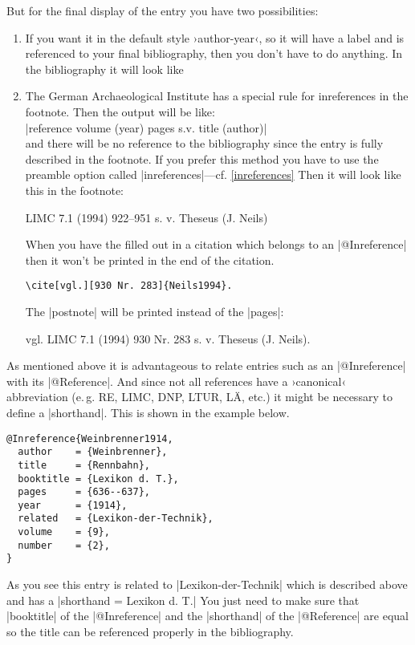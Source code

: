 \documentclass[a4paper,
10pt,
greek,
french,
spanish,
italian,
ngerman,
english
]{ltxdoc}
\begin{document}
But for the final display of the entry  you have two possibilities:
 \begin{enumerate}
\item\label{inreference:a} 

If you want it in the default style ›author-year‹, so it will have a label and is referenced 
to your final bibliography, then you don’t have to do anything.
In the bibliography it will look like

\item\label{inreference:b} 
The German Archaeological Institute has a special rule for inreferences in the footnote.
Then the output will be like:\\
|reference volume (year) pages s.v. title (author)| \\
and there will be no reference to the bibliography since the entry is fully described in the footnote.
 If you prefer this method you have to use the preamble option called  |inreferences|---cf. \cref{inreferences}
Then it will look like this in the footnote:
\begin{bsp}
LIMC 7.1 (1994) 922--951 s. v. Theseus (J. Neils)
\end{bsp}
When you have the  filled out in a citation which belongs to an |@Inreference| then it won’t be printed in the end of the citation.
\begin{lstlisting}
\cite[vgl.][930 Nr. 283]{Neils1994}.
\end{lstlisting}
The |postnote|  will be printed instead of the |pages|:
 \begin{bsp}
vgl. LIMC 7.1 (1994) 930 Nr. 283 s. v. Theseus (J. Neils).
 \end{bsp}
 
\end{enumerate}

As mentioned above it is  advantageous to relate entries such as  an |@Inreference| with its |@Reference|. 
And since not all references have a ›canonical‹ abbreviation (e.\,g. RE, LIMC, DNP, LTUR, LÄ, etc.) it might be necessary to define a |shorthand|.
This is shown in the example below.
 
\begin{lstlisting}[style=bibentry,label=Weinbrenner1914,caption={{@}Inreference\{Weinbrenner1914,…\} }]
@Inreference{Weinbrenner1914,
  author    = {Weinbrenner},
  title     = {Rennbahn},
  booktitle = {Lexikon d. T.},
  pages     = {636--637},
  year      = {1914},
  related   = {Lexikon-der-Technik},
  volume    = {9},
  number    = {2},
}
\end{lstlisting}
As you see this entry is related to |Lexikon-der-Technik| which is described above and has a |shorthand = {Lexikon d. T.}|
You just need to make sure that  |booktitle| of the |@Inreference| and the |shorthand| of 
the  |@Reference| are equal so the title can be referenced properly in the bibliography.
\end{document}

